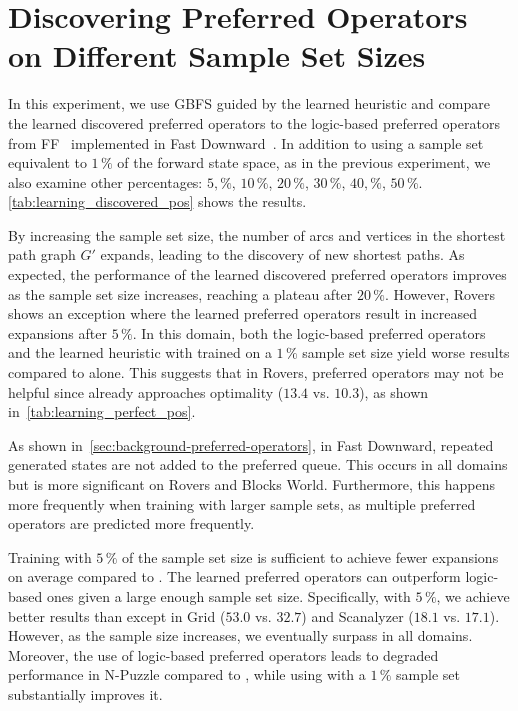 \documentclass[ppgc,diss,english]{iiufrgs}
\begin{document}
\section{Discovering Preferred Operators on Different Sample Set Sizes}
\label{sec:exp-performance-po}
In this experiment, we use GBFS guided by the learned heuristic \hnn and compare the learned discovered preferred operators \pog to the logic-based preferred operators \poff from FF~\cite{Hoffmann.Nebel/2001} implemented in Fast Downward~\cite{Helmert/2006}. In addition to using a sample set equivalent to $1\,\%$ of the forward state space, as in the previous experiment, we also examine other percentages: $5,\%$, $10\,\%$, $20\,\%$, $30\,\%$, $40,\%$, $50\,\%$. \cref{tab:learning_discovered_pos} shows the results.



By increasing the sample set size, the number of arcs and vertices in the shortest path graph $G'$ expands, leading to the discovery of new shortest paths. As expected, the performance of the learned discovered preferred operators \pog improves as the sample set size increases, reaching a plateau after $20\,\%$. However, Rovers shows an exception where the learned preferred operators result in increased expansions after $5\,\%$. In this domain, both the logic-based preferred operators \poff and the learned heuristic \hnn with \pog trained on a $1\,\%$ sample set size yield worse results compared to \hnn alone. This suggests that in Rovers, preferred operators may not be helpful since \hnn already approaches optimality ($13.4$ vs. $10.3$), as shown in~\cref{tab:learning_perfect_pos}.

As shown in~\cref{sec:background-preferred-operators}, in Fast Downward, repeated generated states are not added to the preferred queue. This occurs in all domains but is more significant on Rovers and Blocks World. Furthermore, this happens more frequently when training with larger sample sets, as multiple preferred operators are predicted more frequently. %

Training with $5\,\%$ of the sample set size is sufficient to achieve fewer expansions on average compared to \poff. The learned preferred operators \pog can outperform logic-based ones given a large enough sample set size. Specifically, with $5\,\%$, we achieve better results than \poff except in Grid ($53.0$ vs. $32.7$) and Scanalyzer ($18.1$ vs. $17.1$). However, as the sample size increases, we eventually surpass \poff in all domains. Moreover, the use of logic-based preferred operators \poff leads to degraded performance in N-Puzzle compared to \hnn, while using \pog with a $1\,\%$ sample set substantially improves it.
\end{document}
